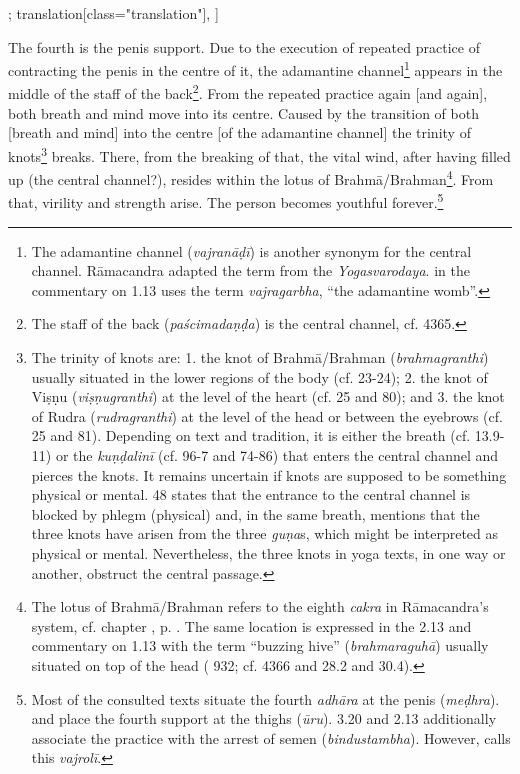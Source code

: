 \begin{alignment}[
  texts=edition[class="edition"];
  translation[class="translation"],
  ]
\begin{translation}
\begin{tlate}[p30_02]
      The fourth is the penis support. Due to the execution of repeated practice of contracting the penis in the centre of it, the adamantine channel\footnote{The adamantine channel (\textit{vajranāḍī}) is another synonym for the central channel. Rāmacandra adapted the term from the \textit{Yogasvarodaya}.  in the commentary on 1.13 uses the term \textit{vajragarbha}, ``the adamantine womb''.} appears in the middle of the staff of the back\footnote{The staff of the back (\textit{paścimadaṇḍa}) is the central channel, cf.  4365.}. From the repeated practice again [and again], both breath and mind move into its centre. Caused by the transition of both [breath and mind] into the centre [of the adamantine channel] the trinity of knots\footnote{The trinity of knots are: 1. the knot of Brahmā/Brahman (\textit{brahmagranthi}) usually situated in the lower regions of the body (cf.  23-24); 2. the knot of Viṣṇu (\textit{viṣṇugranthi}) at the level of the heart (cf.  25 and  80); and 3. the knot of Rudra (\textit{rudragranthi}) at the level of the head or between the eyebrows (cf.  25 and  81). Depending on text and tradition, it is either the breath (cf.  13.9-11) or the \textit{kuṇḍalinī} (cf.  96-7 and  74-86) that enters the central channel and pierces the knots. It remains uncertain if knots are supposed to be something physical or mental.  48 states that the entrance to the central channel is blocked by phlegm (physical) and, in the same breath, mentions that the three knots have arisen from the three \textit{guṇa}s, which might be interpreted as physical or mental. Nevertheless, the three knots in yoga texts, in one way or another, obstruct the central passage.} breaks. There, from the breaking of that, the vital wind, after having filled up (the central channel?), resides within the lotus of Brahmā/Brahman\footnote{The lotus of Brahmā/Brahman refers to the eighth \textit{cakra} in Rāmacandra's system, cf. chapter , p. \pageref{cakra8}. The same location is expressed in the  2.13 and  commentary on 1.13 with the term ``buzzing hive'' (\textit{brahmaraguhā}) usually situated on top of the head ( 932; cf.  4366 and  28.2 and 30.4).}. From that, virility and strength arise. The person becomes youthful forever.\footnote{Most of the consulted texts situate the fourth \textit{adhāra} at the penis (\textit{meḍhra}).  and  place the fourth support at the thighs (\textit{ūru}).  3.20 and  2.13 additionally associate the practice with the arrest of semen (\textit{bindustambha}). However,  calls this \textit{vajrolī}.} %

\end{tlate}
\end{translation}
\end{alignment}
